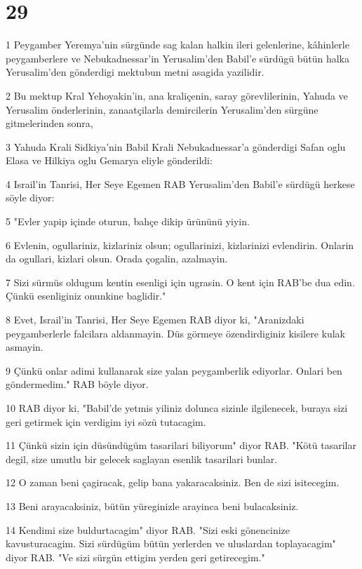 \chapter{29}

\par 1 Peygamber Yeremya'nin sürgünde sag kalan halkin ileri gelenlerine, kâhinlerle peygamberlere ve Nebukadnessar'in Yerusalim'den Babil'e sürdügü bütün halka Yerusalim'den gönderdigi mektubun metni asagida yazilidir.
\par 2 Bu mektup Kral Yehoyakin'in, ana kraliçenin, saray görevlilerinin, Yahuda ve Yerusalim önderlerinin, zanaatçilarla demircilerin Yerusalim'den sürgüne gitmelerinden sonra,
\par 3 Yahuda Krali Sidkiya'nin Babil Krali Nebukadnessar'a gönderdigi Safan oglu Elasa ve Hilkiya oglu Gemarya eliyle gönderildi:
\par 4 Israil'in Tanrisi, Her Seye Egemen RAB Yerusalim'den Babil'e sürdügü herkese söyle diyor:
\par 5 "Evler yapip içinde oturun, bahçe dikip ürününü yiyin.
\par 6 Evlenin, ogullariniz, kizlariniz olsun; ogullarinizi, kizlarinizi evlendirin. Onlarin da ogullari, kizlari olsun. Orada çogalin, azalmayin.
\par 7 Sizi sürmüs oldugum kentin esenligi için ugrasin. O kent için RAB'be dua edin. Çünkü esenliginiz onunkine baglidir."
\par 8 Evet, Israil'in Tanrisi, Her Seye Egemen RAB diyor ki, "Aranizdaki peygamberlerle falcilara aldanmayin. Düs görmeye özendirdiginiz kisilere kulak asmayin.
\par 9 Çünkü onlar adimi kullanarak size yalan peygamberlik ediyorlar. Onlari ben göndermedim." RAB böyle diyor.
\par 10 RAB diyor ki, "Babil'de yetmis yiliniz dolunca sizinle ilgilenecek, buraya sizi geri getirmek için verdigim iyi sözü tutacagim.
\par 11 Çünkü sizin için düsündügüm tasarilari biliyorum" diyor RAB. "Kötü tasarilar degil, size umutlu bir gelecek saglayan esenlik tasarilari bunlar.
\par 12 O zaman beni çagiracak, gelip bana yakaracaksiniz. Ben de sizi isitecegim.
\par 13 Beni arayacaksiniz, bütün yüreginizle arayinca beni bulacaksiniz.
\par 14 Kendimi size buldurtacagim" diyor RAB. "Sizi eski gönencinize kavusturacagim. Sizi sürdügüm bütün yerlerden ve uluslardan toplayacagim" diyor RAB. "Ve sizi sürgün ettigim yerden geri getirecegim."

